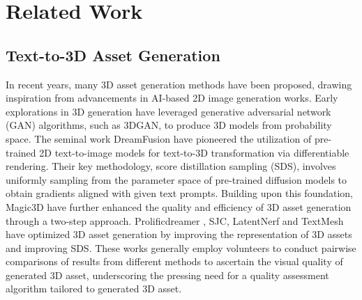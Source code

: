 
\section{Related Work}
\subsection{Text-to-3D Asset Generation}
In recent years, many 3D asset generation methods have been proposed, drawing inspiration from advancements in AI-based 2D image generation works. Early explorations in 3D generation \cite{henzler2019escaping} have leveraged generative adversarial network (GAN) algorithms, such as 3DGAN, to produce 3D models from probability space. The seminal work DreamFusion \cite{poole2022dreamfusion} have pioneered the utilization of pre-trained 2D text-to-image models for text-to-3D transformation via differentiable rendering. Their key methodology, score distillation sampling (SDS), involves uniformly sampling from the parameter space of pre-trained diffusion models to obtain gradients aligned with given text prompts. Building upon this foundation, Magic3D \cite{lin2023magic3d} have further enhanced the quality and efficiency of 3D asset generation through a two-step approach. Prolificdreamer \cite{wang2024prolificdreamer}, SJC\cite{wang2023score}, LatentNerf \cite{metzer2023latent} and TextMesh \cite{tsalicoglou2023textmesh} have optimized 3D asset generation by improving the representation of 3D assets and improving SDS. These works generally employ volunteers to conduct pairwise comparisons of results from different methods to ascertain the visual quality of generated 3D asset, underscoring the pressing need for a quality assessment algorithm tailored to generated 3D asset.

